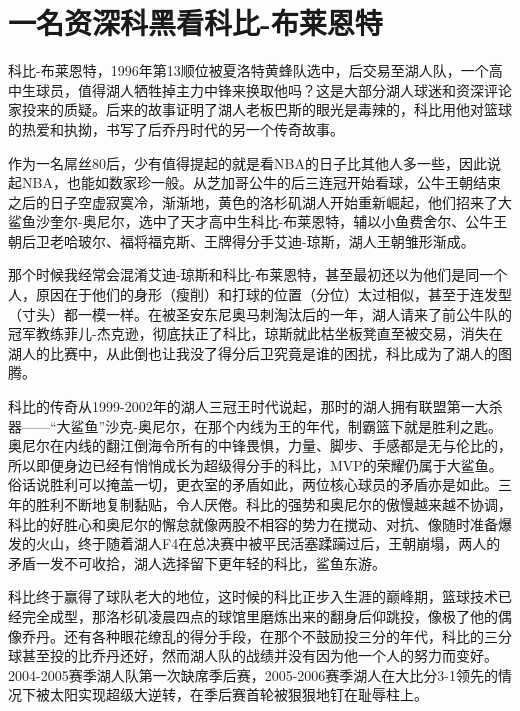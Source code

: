 \documentclass[]{book}
\begin{document}
\hypertarget{ux4e00ux540dux8d44ux6df1ux79d1ux9ed1ux770bux79d1ux6bd4-ux5e03ux83b1ux6069ux7279}{%
\section{一名资深科黑看科比-布莱恩特}\label{ux4e00ux540dux8d44ux6df1ux79d1ux9ed1ux770bux79d1ux6bd4-ux5e03ux83b1ux6069ux7279}}

科比-布莱恩特，1996年第13顺位被夏洛特黄蜂队选中，后交易至湖人队，一个高中生球员，值得湖人牺牲掉主力中锋来换取他吗？这是大部分湖人球迷和资深评论家投来的质疑。后来的故事证明了湖人老板巴斯的眼光是毒辣的，科比用他对篮球的热爱和执拗，书写了后乔丹时代的另一个传奇故事。

作为一名屌丝80后，少有值得提起的就是看NBA的日子比其他人多一些，因此说起NBA，也能如数家珍一般。从芝加哥公牛的后三连冠开始看球，公牛王朝结束之后的日子空虚寂寞冷，渐渐地，黄色的洛杉矶湖人开始重新崛起，他们招来了大鲨鱼沙奎尔-奥尼尔，选中了天才高中生科比-布莱恩特，辅以小鱼费舍尔、公牛王朝后卫老哈玻尔、福将福克斯、王牌得分手艾迪-琼斯，湖人王朝雏形渐成。

那个时候我经常会混淆艾迪-琼斯和科比-布莱恩特，甚至最初还以为他们是同一个人，原因在于他们的身形（瘦削）和打球的位置（分位）太过相似，甚至于连发型（寸头）都一模一样。在被圣安东尼奥马刺淘汰后的一年，湖人请来了前公牛队的冠军教练菲儿-杰克逊，彻底扶正了科比，琼斯就此枯坐板凳直至被交易，消失在湖人的比赛中，从此倒也让我没了得分后卫究竟是谁的困扰，科比成为了湖人的图腾。

科比的传奇从1999-2002年的湖人三冠王时代说起，那时的湖人拥有联盟第一大杀器------``大鲨鱼''沙克-奥尼尔，在那个内线为王的年代，制霸篮下就是胜利之匙。奥尼尔在内线的翻江倒海令所有的中锋畏惧，力量、脚步、手感都是无与伦比的，所以即便身边已经有悄悄成长为超级得分手的科比，MVP的荣耀仍属于大鲨鱼。俗话说胜利可以掩盖一切，更衣室的矛盾如此，两位核心球员的矛盾亦是如此。三年的胜利不断地复制黏贴，令人厌倦。科比的强势和奥尼尔的傲慢越来越不协调，科比的好胜心和奥尼尔的懈怠就像两股不相容的势力在搅动、对抗、像随时准备爆发的火山，终于随着湖人F4在总决赛中被平民活塞蹂躏过后，王朝崩塌，两人的矛盾一发不可收拾，湖人选择留下更年轻的科比，鲨鱼东游。

科比终于赢得了球队老大的地位，这时候的科比正步入生涯的巅峰期，篮球技术已经完全成型，那洛杉矶凌晨四点的球馆里磨炼出来的翻身后仰跳投，像极了他的偶像乔丹。还有各种眼花缭乱的得分手段，在那个不鼓励投三分的年代，科比的三分球甚至投的比乔丹还好，然而湖人队的战绩并没有因为他一个人的努力而变好。2004-2005赛季湖人队第一次缺席季后赛，2005-2006赛季湖人在大比分3-1领先的情况下被太阳实现超级大逆转，在季后赛首轮被狠狠地钉在耻辱柱上。
\end{document}

